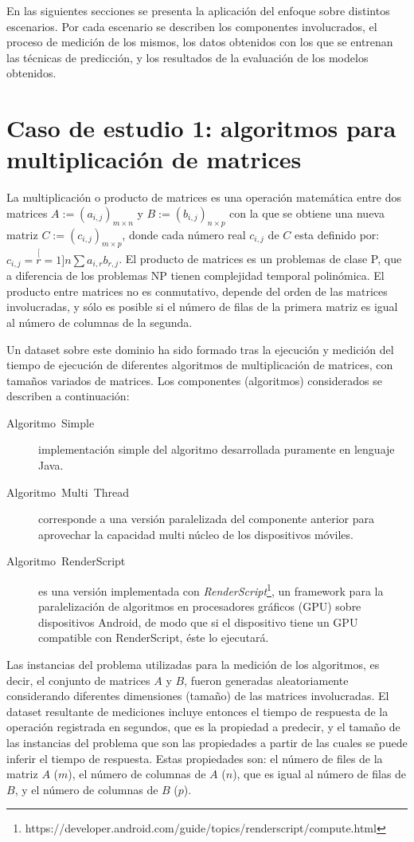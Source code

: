 En las siguientes secciones se presenta la aplicación del enfoque
sobre distintos escenarios. Por cada escenario se describen los componentes
involucrados, el proceso de medición de los mismos, los datos obtenidos
con los que se entrenan las técnicas de predicción, y los resultados
de la evaluación de los modelos obtenidos.


\section{Caso de estudio 1: algoritmos para multiplicación de matrices\label{subsec:Escenario-4:-Multiplicaci=0000F3n}}

La multiplicación o producto de matrices es una operación matemática
entre dos matrices $A:=(a_{i,j})_{m\times n}$ y $B:=(b_{i,j})_{n\times p}$
con la que se obtiene una nueva matriz $C:=(c_{i,j})_{m\times p}$,
donde cada número real $c_{i,j}$ de $C$ esta definido por: $c_{i,j}=\stackrel[r=1]{n}{\sum}a_{i,r}b_{r,j}$.
El producto de matrices es un problemas de clase P, que a diferencia
de los problemas NP tienen complejidad temporal polinómica. El producto
entre matrices no es conmutativo, depende del orden de las matrices
involucradas, y sólo es posible si el número de filas de la primera
matriz es igual al número de columnas de la segunda. 

Un dataset sobre este dominio ha sido formado tras la ejecución y
medición del tiempo de ejecución de diferentes algoritmos de multiplicación
de matrices, con tamaños variados de matrices. Los componentes (algoritmos)
considerados se describen a continuación: 
\begin{description}
\item [{Algoritmo~Simple}] implementación simple del algoritmo desarrollada
puramente en lenguaje Java. 
\item [{Algoritmo~Multi~Thread}] corresponde a una versión paralelizada
del componente anterior para aprovechar la capacidad multi núcleo
de los dispositivos móviles.
\item [{Algoritmo~RenderScript}] es una versión implementada con \emph{RenderScript}\footnote{https://developer.android.com/guide/topics/renderscript/compute.html},
un framework para la paralelización de algoritmos en procesadores
gráficos (GPU) sobre dispositivos Android, de modo que si el dispositivo
tiene un \ac{GPU} compatible con RenderScript, éste lo ejecutará.
\end{description}
Las instancias del problema utilizadas para la medición de los algoritmos,
es decir, el conjunto de matrices $A$ y $B$, fueron generadas aleatoriamente
considerando diferentes dimensiones (tamaño) de las matrices involucradas.
El dataset resultante de mediciones incluye entonces el tiempo de
respuesta de la operación registrada en segundos, que es la propiedad
a predecir, y el tamaño de las instancias del problema que son las
propiedades a partir de las cuales se puede inferir el tiempo de respuesta.
Estas propiedades son: el número de files de la matriz $A$ ($m$),
el número de columnas de $A$ ($n$), que es igual al número de filas
de $B$, y el número de columnas de $B$ (\emph{$p$}).

